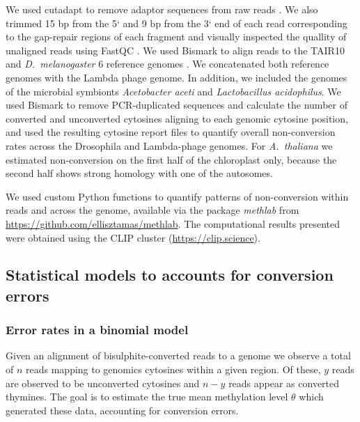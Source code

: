 \documentclass[twocolumn,twoside,lettersize]{article}
\begin{document}
We used cutadapt to remove adaptor sequences from raw reads \parencite{martin2011cutadapt}.
We also trimmed 15 bp from the 5` and 9 bp from the 3` end of each read corresponding to the gap-repair regions of each fragment and visually inspected the quallity of unaligned reads using FastQC \parencite{andrews2020fastqc}.
We used Bismark to align reads to the TAIR10 and \textit{D.~melanogaster} 6 reference genomes \parencite{krueger2011bismark}.
We concatenated both reference genomes with the Lambda phage genome.
In addition, we included the genomes of the microbial symbionts \textit{Acetobacter aceti} and \textit{Lactobacillus acidophilus}.
We used Bismark to remove PCR-duplicated sequences and calculate the number of converted and unconverted cytosines aligning to each genomic cytosine position, and used the resulting cytosine report files to quantify overall non-conversion rates across the Drosophila and Lambda-phage genomes.
For \emph{A.~thaliana} we estimated non-conversion on the first half of the chloroplast only, because the second half shows strong homology with one of the autosomes.

We used custom Python functions to quantify patterns of non-conversion within reads and across the genome, available via the package \textit{methlab} from \url{https://github.com/ellisztamas/methlab}.
The computational results presented were obtained using the CLIP cluster (\url{https://clip.science}).

\subsection{Statistical models to accounts for conversion errors}

\subsubsection{Error rates in a binomial model} \label{sec:binomial-with-errors}

Given an alignment of bisulphite-converted reads to a genome we observe a total of $n$ reads mapping to genomics cytosines within a given region.
Of these, $y$ reads are observed to be unconverted cytosines and $n-y$ reads appear as converted thymines.
The goal is to estimate the true mean methylation level $\theta$ which generated these data, accounting for conversion errors.
\end{document}
